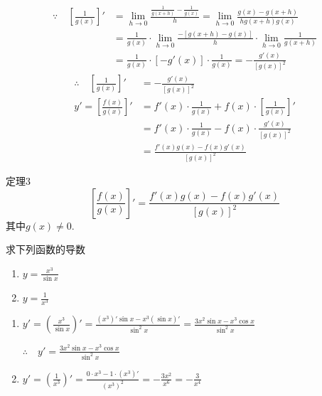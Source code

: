 \[\begin{split}
  \because\quad   \left[\frac{1}{g(x)}\right]' &=\lim_{h\to 0}\frac{\frac{1}{g(x+h)}-\frac{1}{g(x)}}{h}=\lim_{h\to 0}\frac{g(x)-g(x+h)}{hg(x+h)g(x)}\\
    &=\frac{1}{g(x)}\cdot \lim_{h\to 0}\frac{-[g(x+h)-g(x)]}{h}\cdot \lim_{h\to 0}\frac{1}{g(x+h)}\\
&=\frac{1}{g(x)}\cdot [-g'(x)]\cdot \frac{1}{g(x)}=-\frac{g'(x)}{[g(x)]^2}
\end{split}\]
\[\begin{split}
    \therefore\quad \left[\frac{1}{g(x)}\right]' &=-\frac{g'(x)}{[g(x)]^2}\\
    y'=\left[\frac{f(x)}{g(x)}\right]'&=f' \left(x\right)\cdot\frac{1}{g\left(x\right)}+f\left(x\right)\cdot\left[\frac{1}{g\left(x\right)}\right]' \\
    &=f' \left(x\right)\cdot\frac{1}{g\left(x\right)}-f\left(x\right)\cdot\frac{g' \left(x\right)}{\left[g\left(x\right)\right]^{2}}\\
    &=\frac{f' \left(x\right)g\left(x\right)-f\left(x\right)g' \left(x\right)}{\left[g\left(x\right)\right]^{2}}
\end{split}\]

\begin{thm}{定理3}
\[\left[\frac{f(x)}{g(x)}\right]'=\frac{f' \left(x\right)g\left(x\right)-f\left(x\right)g' \left(x\right)}{\left[g\left(x\right)\right]^{2}}\]
其中$g(x)\ne 0$.
\end{thm}

\begin{example}
    求下列函数的导数
\begin{multicols}{2}
\begin{enumerate}[(1)]
    \item $y=\frac{x^3}{\sin x}$
    \item $y=\frac{1}{x^3}$
\end{enumerate}
\end{multicols}
\end{example}

\begin{solution}
\begin{enumerate}[(1)]
    \item $y'=\left(\frac{x^3}{\sin x}\right)'=\frac{(x^3)'\sin x-x^3 (\sin x)'}{\sin^2 x}=\frac{3x^2\sin x-x^3\cos x}{\sin^2 x}$
    
    $\therefore\quad y'=\frac{3x^2\sin x-x^3\cos x}{\sin^2 x}$
    \item $y'=\left(\frac{1}{x^3}\right)'=\frac{0\cdot x^3-1\cdot (x^3)'}{(x^3)^2}=-\frac{3x^2}{x^6}=-\frac{3}{x^4}$
\end{enumerate}    
\end{solution}

